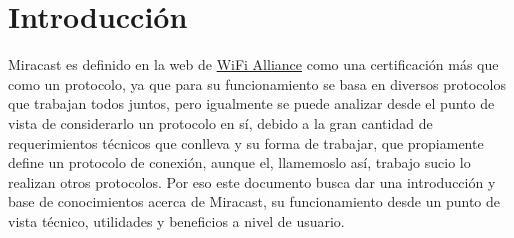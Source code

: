 \section{Introducción}

Miracast es definido en la web de \href{http://www.wi-fi.org/discover-wi-fi/wi-fi-certified-miracast}{WiFi Alliance} como una certificación más que como un protocolo, ya que para su funcionamiento se basa en diversos protocolos que trabajan todos juntos, pero igualmente se puede analizar desde el punto de vista de considerarlo un protocolo en sí, debido a la gran cantidad de requerimientos técnicos que conlleva y su forma de trabajar, que propiamente define un protocolo de conexión, aunque el, llamemoslo así, trabajo sucio lo realizan otros protocolos. Por eso este documento busca dar una introducción y base de conocimientos acerca de Miracast, su funcionamiento desde un punto de vista técnico, utilidades y beneficios a nivel de usuario.
